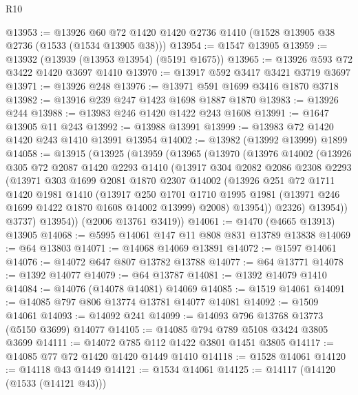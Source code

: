 \begin{lexlean}{R10}
\begin{coremodule}
@13953 := @13926 @60 @72 @1420 @1420 @2736 @1410 (@1528 @13905 @38 @2736 (@1533 (@1534 @13905 @38)))
@13954 := @1547 @13905
@13959 := @13932 (@13939 (@13953 @13954) (@5191 @1675))
@13965 := @13926 @593 @72 @3422 @1420 @3697 @1410
@13970 := @13917 @592 @3417 @3421 @3719 @3697
@13971 := @13926 @248
@13976 := @13971 @591 @1699 @3416 @1870 @3718
@13982 := @13916 @239 @247 @1423 @1698 @1887 @1870
@13983 := @13926 @244
@13988 := @13983 @246 @1420 @1422 @243 @1608
@13991 := @1647 @13905 @11 @243
@13992 := @13988 @13991
@13999 := @13983 @72 @1420 @1420 @243 @1410 @13991 @13954
@14002 := @13982 (@13992 @13999) @1899
@14058 := @13915
    (@13925
      (@13959
        (@13965
          (@13970
            (@13976
              @14002
              (@13926
                @305
                @72
                @2087
                @1420
                @2293
                @1410
                (@13917
                  @304
                  @2082
                  @2086
                  @2308
                  @2293
                  (@13971
                    @303
                    @1699
                    @2081
                    @1870
                    @2307
                    @14002
                    (@13926
                      @251
                      @72
                      @1711
                      @1420
                      @1981
                      @1410
                      (@13917
                        @250
                        @1701
                        @1710
                        @1995
                        @1981
                        (@13971 @246 @1699 @1422 @1870 @1608 @14002 @13999)
                        @2008)
                      @13954))
                  @2326)
                @13954))
            @3737)
          @13954))
      (@2006 @13761 @3419))
@14061 := @1470 (@4665 @13913) @13905
@14068 := @5995 @14061 @147 @11 @808 @831 @13789 @13838
@14069 := @64 @13803
@14071 := @14068 @14069 @13891
@14072 := @1597 @14061
@14076 := @14072 @647 @807 @13782 @13788
@14077 := @64 @13771
@14078 := @1392 @14077
@14079 := @64 @13787
@14081 := @1392 @14079 @1410
@14084 := @14076 (@14078 @14081) @14069
@14085 := @1519 @14061
@14091 := @14085 @797 @806 @13774 @13781 @14077 @14081
@14092 := @1509 @14061
@14093 := @14092 @241
@14099 := @14093 @796 @13768 @13773 (@5150 @3699) @14077
@14105 := @14085 @794 @789 @5108 @3424 @3805 @3699
@14111 := @14072 @785 @112 @1422 @3801 @1451 @3805
@14117 := @14085 @77 @72 @1420 @1420 @1449 @1410
@14118 := @1528 @14061
@14120 := @14118 @43 @1449
@14121 := @1534 @14061
@14125 := @14117 (@14120 (@1533 (@14121 @43)))

\end{coremodule}
\end{lexlean}
